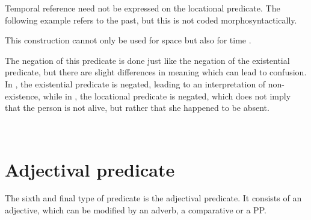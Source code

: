 
Temporal reference need not be expressed on the locational predicate. The following example refers to the past, but this is not coded morphosyntactically.



This construction cannot only be used for space  but also for time .



The negation of this predicate is done just like the negation of the existential predicate, but there are slight differences in meaning which can lead to confusion. In , the existential predicate is negated, leading to an interpretation of non-existence, while in , the locational predicate is negated, which does not imply that the person is not alive, but rather that she happened to be absent.




 \\ 

\section{Adjectival predicate}\label{sec:pred:Adjectivalpredicate}
The sixth and final type of predicate is the adjectival predicate. It consists of an adjective, which can be modified by an adverb, a comparative   or a PP.


